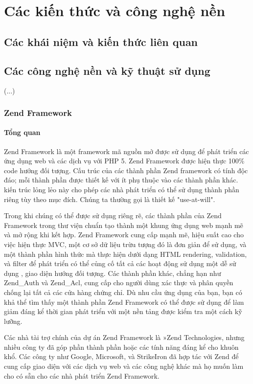 \chapter{Các kiến thức và công nghệ nền}

\section{Các khái niệm và kiến thức liên quan}

\section{Các công nghệ nền và kỹ thuật sử dụng}
(...)
\subsection{Zend Framework}
\subsubsection{Tổng quan}

Zend Framework là một framework mã nguồn mở được sử dụng để phát triển các ứng dụng web và các dịch vụ với PHP 5. Zend Framework được hiện thực 100\% code hướng đối tượng. Cấu trúc của các thành phần Zend framework có tính độc đáo; mỗi thành phần được thiết kế với ít phụ thuộc vào các thành phần khác. kiến trúc lỏng lẻo này cho phép các nhà phát triển có thể sử dụng thành phần riêng tùy theo mục đích. Chúng ta thường gọi là thiết kế "use-at-will".

Trong khi chúng có thể được sử dụng riêng rẽ, các thành phần của Zend Framework trong thư viện chuẩn tạo thành một khung ứng dụng web mạnh mẽ và mở rộng khi kết hợp. Zend Framework cung cấp mạnh mẽ, hiệu suất cao cho việc hiện thực MVC, một cơ sở dữ liệu trừu tượng đó là đơn giản để sử dụng, và một thành phần hình thức mà thực hiện dưới dạng HTML rendering, validation, và filter để phát triển có thể củng cố tất cả các hoạt động sử dụng một dễ sử dụng , giao diện hướng đối tượng. Các thành phần khác, chẳng hạn như Zend\_Auth và Zend\_Acl, cung cấp cho người dùng xác thực và phân quyền chống lại tất cả các cửa hàng chứng chỉ. Dù nhu cầu ứng dụng của bạn, bạn có khả thể tìm thấy một thành phần Zend Framework có thể được sử dụng để làm giảm đáng kể thời gian phát triển với một nền tảng được kiểm tra một cách kỹ lưỡng.

Các nhà tài trợ chính của dự án Zend Framework là »Zend Technologies, nhưng nhiều công ty đã góp phần thành phần hoặc các tính năng đáng kể cho khuôn khổ. Các công ty như Google, Microsoft, và StrikeIron đã hợp tác với Zend để cung cấp giao diện với các dịch vụ web và các công nghệ khác mà họ muốn làm cho có sẵn cho các nhà phát triển Zend Framework.

